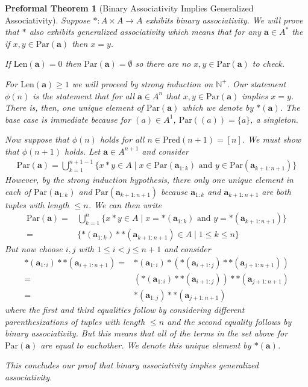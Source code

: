 \documentclass[oneside, 12pt]{book}
\theoremstyle{break}
\newtheorem{preformal definition}[definition]{Preformal Definition}
\newtheorem{preformal theorem}[theorem]{Preformal Theorem}
\newcommand{\bv}[1]{\boldsymbol{#1}}
\newcommand{\N}[0]{\mathbb{N}}
\begin{document}
			\begin{preformal theorem}[Binary Associativity Implies Generalized Associativity]
				Suppose $\ast: A \times A \to A$ exhibits binary associativity.
				We will prove that $\ast$ also exhibits generalized associativity which means that for any $\bv{a} \in A^*$ the if $x, y \in \text{Par}(\bv{a})$ then $x=y$.
				
				If $\text{Len}(\bv{a}) = 0$ then $\text{Par}(\bv{a}) = \emptyset$ so there are no $x, y \in \text{Par}(\bv{a})$ to check.
				
				For $\text{Len}(\bv{a}) \ge 1$ we will proceed by strong induction on $\N^+$.
				Our statement $\phi(n)$ is the statement that for all $\bv{a} \in A^n$ that $x, y \in \text{Par}(\bv{a})$ implies $x=y$. 
				There is, then, one unique element of $\text{Par}(\bv{a})$ which we denote by $\ast(\bv{a})$.
				The base case is immediate because for $(a) \in A^1$, $\text{Par}((a)) = \{a\}$, a singleton.
				
				Now suppose that $\phi(n)$ holds for all $n\in \text{Pred}(n+1) = [n]$. 
				We must show that $\phi(n+1)$ holds.
				Let $\bv{a} \in A^{n+1}$ and consider
				\begin{align*}
					\text{Par}(\bv{a}) = \bigcup_{k=1}^{n+1-1} \{x\ast y \in A \mid x\in \text{Par}(\bv{a}_{1:k}) \text{ and } y\in \text{Par}(\bv{a}_{k+1:n+1})\}
				\end{align*}
				However, by the strong induction hypothesis, there only one unique element in each of $\text{Par}(\bv{a}_{1:k})$ and $\text{Par}(\bv{a}_{k+1:n+1})$ because $\bv{a}_{1:k}$ and $\bv{a}_{k+1:n+1}$ are both tuples with length  $\le n$.
				We can then write
				\begin{align*}
					\text{Par}(\bv{a}) =& \bigcup_{k=1}^n \{x \ast y \in A \mid x = \ast(\bv{a}_{1:k}) \text{ and } y = \ast(\bv{a}_{k+1:n+1})\}\\
					=&  \{\ast(\bv{a}_{1:k}) \ast \ast(\bv{a}_{k+1:n+1}) \in A \mid 1 \le k \le n\}
				\end{align*}
				But now choose $i, j$ with $1 \le i < j \le n+1$ and consider
				\begin{align*}
					\ast(\bv{a}_{1:i}) \ast \ast(\bv{a}_{i+1:n+1}) =& \ast(\bv{a}_{1:i}) \ast (\ast(\bv{a}_{i+1:j}) \ast \ast(\bv{a}_{j+1:n+1}))\\
					=& (\ast(\bv{a}_{1:i}) \ast \ast(\bv{a}_{i+1:j})) \ast \ast(\bv{a}_{j+1:n+1})\\
					=& \ast(\bv{a}_{1:j}) \ast \ast(\bv{a}_{j+1:n+1}) 
				\end{align*}
				where the first and third equalities follow by considering different parenthesizations of tuples with length $\le n$ and the second equality follows by binary associativity.
				But this means that all of the terms in the set above for $\text{Par}(\bv{a})$ are equal to eachother.
				We denote this unique element by $\ast(\bv{a})$.
				
				This concludes our proof that binary associativity implies generalized associativity.
			\end{preformal theorem}
		
\end{document}
